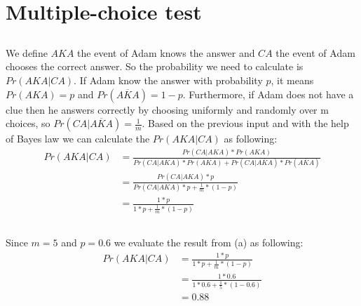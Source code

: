 \documentclass[11pt]{537homework}
\author{Emmanouil Kritharakis}
\begin{document}
\section{Multiple-choice test}


\subsection{}
We define $AKA$ the event of Adam knows the answer and $CA$ the event of Adam chooses the correct answer. So the probability we need to calculate is $Pr(AKA|CA)$. If Adam know the answer with probability $p$, it means $Pr(AKA) = p$ and $Pr(\overline{AKA}) = 1-p$. Furthermore, if Adam does not have a clue then he answers correctly by choosing uniformly and randomly over m choices, so $Pr(CA|\overline{AKA})= \frac{1}{m}$. Based on the previous input and with the help of Bayes law we can calculate the $Pr(AKA|CA)$ as following:
   \begin{align*}
        Pr(AKA|CA) &= \frac{Pr(CA|AKA)*Pr(AKA)}{Pr(CA|AKA)*Pr(AKA)+Pr(CA|\overline{AKA})*Pr(\overline{AKA})} \\[0.25cm]
                &= \displaystyle{\frac{Pr(CA|AKA)* p }{Pr(CA|AKA)*p+\frac{1}{m}*(1-p)}} \\[0.25cm]
                &= \displaystyle{\frac{1* p }{1*p+\frac{1}{m}*(1-p)}} 
   \end{align*}
        

\subsection{}
Since $m=5$ and $p=0.6$ we evaluate the result from (a) as following:  
   \begin{align*}
        Pr(AKA|CA) &= \displaystyle{\frac{1* p }{1*p+\frac{1}{m}*(1-p)}}  \\[0.25cm]
                   &= \displaystyle{\frac{1* 0.6 }{1*0.6+\frac{1}{5}*(1-0.6)}}  \\[0.25cm]
                   &= 0.88  
   \end{align*}
\end{document}
